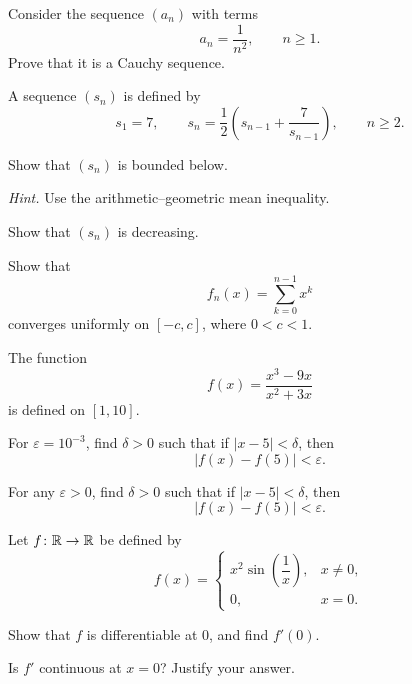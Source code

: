 \begin{problem}
Consider the sequence $(a_n)$ with terms
\[
a_n=\frac{1}{n^2},
\qquad n\ge1.
\]
Prove that it is a Cauchy sequence.
\end{problem}

\begin{problem}
A sequence $(s_n)$ is defined by
\[
s_1=7,
\qquad
s_n=\frac12\left(s_{n-1}+\frac{7}{s_{n-1}}\right),
\qquad n\ge2.
\]
\begin{problemsubparts}
\item Show that $(s_n)$ is bounded below.

\textit{Hint.} Use the arithmetic--geometric mean inequality.
\item Show that $(s_n)$ is decreasing.
\end{problemsubparts}
\end{problem}

\begin{problem}
Show that
\[
f_n(x)=\sum_{k=0}^{n-1}x^k
\]
converges uniformly on $[-c, c]$, where $0<c<1$.
\end{problem}

\begin{problem}
The function
\[
f(x)=\frac{x^3-9x}{x^2+3x}
\]
is defined on $[1, 10]$.
\begin{problemsubparts}
\item For $\varepsilon=10^{-3}$, find $\delta>0$ such that if $|x-5|<\delta$, then
\[
|f(x)-f(5)|<\varepsilon.
\]
\item For any $\varepsilon>0$, find $\delta>0$ such that if $|x-5|<\delta$, then
\[
|f(x)-f(5)|<\varepsilon.
\]
\end{problemsubparts}
\end{problem}

\begin{problem}
Let $f\colon\mathbb{R}\to\mathbb{R}$ be defined by
\[
f(x)=
\begin{cases}
x^2\sin\!\left(\dfrac1x\right), & x\ne0, \\[0.5em]
0, & x=0.
\end{cases}
\]
\begin{problemsubparts}
\item Show that $f$ is differentiable at $0$, and find $f'(0)$.
\item Is $f'$ continuous at $x=0$? Justify your answer.
\end{problemsubparts}
\end{problem}

